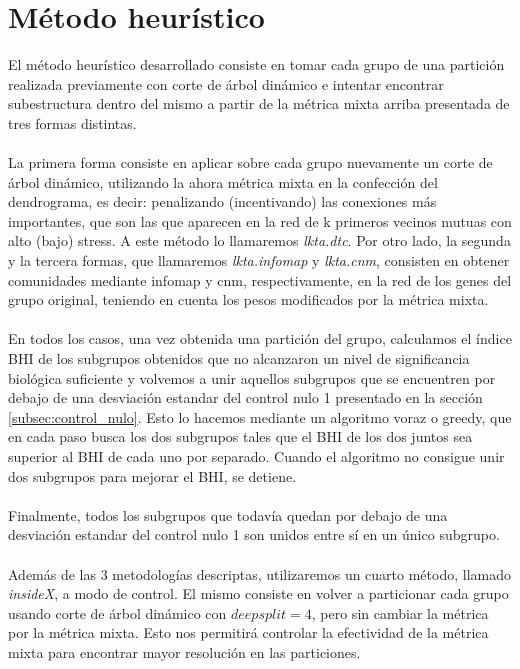 \section{Método heurístico}
El método heurístico desarrollado consiste en tomar cada grupo de una partición realizada previamente con corte de árbol dinámico e intentar encontrar subestructura dentro del mismo a partir de la métrica mixta arriba presentada de tres formas distintas.\\\\
La primera forma consiste en aplicar sobre cada grupo nuevamente un corte de árbol dinámico, utilizando la ahora métrica mixta en la confección del dendrograma, es decir: penalizando (incentivando) las conexiones más importantes, que son las que aparecen en la red de k primeros vecinos mutuas con alto (bajo) stress. A este método lo llamaremos \textit{lkta.dtc}. Por otro lado, la segunda y la tercera formas, que llamaremos \textit{lkta.infomap} y \textit{lkta.cnm}, consisten en obtener comunidades mediante infomap y cnm, respectivamente, en la red de los genes del grupo original, teniendo en cuenta los pesos modificados por la métrica mixta.\\\\
En todos los casos, una vez obtenida una partición del grupo, calculamos el índice BHI de los subgrupos obtenidos que no alcanzaron un nivel de significancia biológica suficiente y volvemos a unir aquellos subgrupos que se encuentren por debajo de una desviación estandar del control nulo 1 presentado en la sección \ref{subsec:control_nulo}. Esto lo hacemos mediante un algoritmo voraz o greedy, que en cada paso busca los dos subgrupos tales que el BHI de los dos juntos sea superior al BHI de cada uno por separado. Cuando el algoritmo no consigue unir dos subgrupos para mejorar el BHI, se detiene.\\\\ Finalmente, todos los subgrupos que todavía quedan por debajo de una desviación estandar del control nulo 1 son unidos entre sí en un único subgrupo.\\\\
Además de las 3 metodologías descriptas, utilizaremos un cuarto método, llamado \textit{insideX}, a modo de control. El mismo consiste en volver a particionar cada grupo usando corte de árbol dinámico con $deepsplit=4$, pero sin cambiar la métrica por la métrica mixta. Esto nos permitirá controlar la efectividad de la métrica mixta para encontrar mayor resolución en las particiones.\\\\
